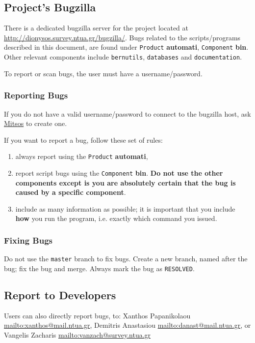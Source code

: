\subsection{Project's Bugzilla}\label{subsec:bugs1}
There is a dedicated bugzilla server for the project located at \url{http://dionysos.survey.ntua.gr/bugzilla/}.
Bugs related to the scripts/programs described in this document, are found under
\texttt{Product} \textbf{automati}, \texttt{Component} \textbf{bin}. Other relevant
components include \texttt{bernutils}, \texttt{databases} and \texttt{documentation}.

To report or scan bugs, the user must have a username/password.

\subsubsection{Reporting Bugs}
If you do not have a valid username/password to connect to the bugzilla host, ask
\href{mailto:danast@mail.ntua.gr}{Mitsos} to create one.

If you want to report a bug, follow these set of rules:
\begin{enumerate}
\item always report using the \texttt{Product} \textbf{automati},
\item report script bugs using the \texttt{Component} \textbf{bin}. \textbf{Do not use the
other components except is you are absolutely certain that the bug is caused by a specific
component}.
\item include as many information as possible; it is important that you include \textbf{how}
you run the program, i.e. exactly which command you issued.
\end{enumerate}

\subsubsection{Fixing Bugs}
Do not use the \texttt{master} branch to fix bugs. Create a new branch, named after
the bug; fix the bug and merge. Always mark the bug as \texttt{RESOLVED}.

\subsection{Report to Developers}
Users can also directly report bugs, to:
Xanthos Papanikolaou \href{mailto:xanthos@mail.ntua.gr}{mailto:xanthos@mail.ntua.gr},
Demitris Anastasiou  \href{mailto:danast@mail.ntua.gr}{mailto:danast@mail.ntua.gr}, or
Vangelis Zacharis  \href{mailto:vanzach@survey.ntua.gr}{mailto:vanzach@survey.ntua.gr}